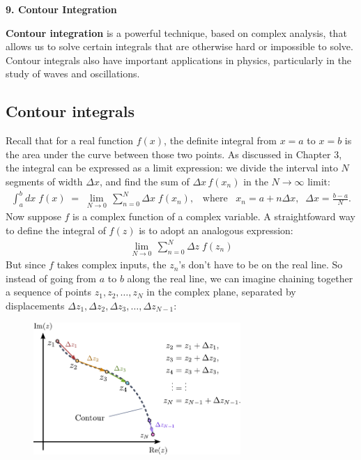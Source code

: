 \documentclass[10pt,a4paper]{article}
\begin{document}
\setcounter{page}{63}

\noindent
{\Large \textbf{9. Contour Integration}}
\vskip 0.2in

\label{contour-integration}

\textbf{Contour integration} is a powerful technique, based on complex
analysis, that allows us to solve certain integrals that are otherwise
hard or impossible to solve.  Contour integrals also have important
applications in physics, particularly in the study of waves and
oscillations.

\subsection{Contour integrals}
\label{contour-integrals}

Recall that for a real function $f(x)$, the definite integral from
$x=a$ to $x=b$ is the area under the curve between those two
points. As discussed in Chapter 3, the integral can be expressed as a
limit expression: we divide the interval into $N$ segments of width
$\Delta x$, and find the sum of $\Delta x\, f(x_n)$ in the $N
\rightarrow \infty$ limit:
\begin{align}
  \int_a^b dx\; f(x) \;=\; \lim_{N \rightarrow 0} \, \sum_{n=0}^{N} \Delta x\; f(x_n), \;\;\;\mathrm{where}\;\;\;x_n = a + n\Delta x, \;\;\Delta x = \frac{b-a}{N}.
\end{align}
Now suppose $f$ is a complex function of a complex variable. A
straightfoward way to define the integral of $f(z)$ is to adopt an
analogous expression:
\begin{align*}
  \lim_{N \rightarrow 0} \, \sum_{n=0}^{N} \Delta z\; f(z_n)
\end{align*}
But since $f$ takes complex inputs, the $z_n$'s don't have to be on
the real line. So instead of going from $a$ to $b$ along the real
line, we can imagine chaining together a sequence of points $z_1, z_2,
\dots, z_N$ in the complex plane, separated by displacements $\Delta
z_1, \Delta z_2, \Delta z_3, \dots, \Delta z_{N-1}$:

\begin{figure}[ht]
  \centering\includegraphics[width=0.7\textwidth]{complex_integral}
\end{figure}
\end{document}
